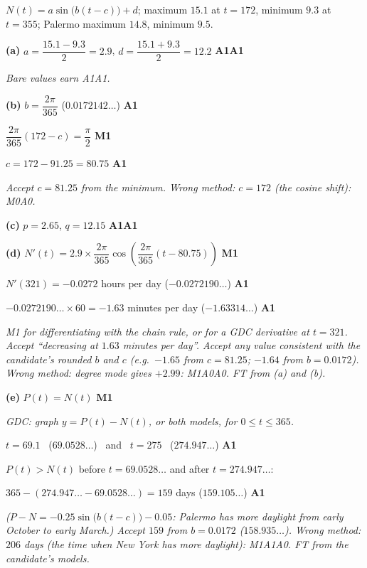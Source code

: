 \documentclass[12pt, twoside]{article}
\begin{document}
\begin{enumerate}[itemsep=0.3cm]
$N(t) = a\sin\bigl(b(t - c)\bigr) + d$; maximum $15.1$ at $t = 172$,
minimum $9.3$ at $t = 355$; Palermo maximum $14.8$, minimum $9.5$.

\textbf{(a)} $a = \dfrac{15.1 - 9.3}{2} = 2.9$, \quad
$d = \dfrac{15.1 + 9.3}{2} = 12.2$ \hfill \textbf{A1A1}

\emph{Bare values earn A1A1.}

\textbf{(b)} $b = \dfrac{2\pi}{365}$ \quad ($0.0172142\ldots$) \hfill \textbf{A1}

$\dfrac{2\pi}{365}(172 - c) = \dfrac{\pi}{2}$ \hfill \textbf{M1}

$c = 172 - 91.25 = 80.75$ \hfill \textbf{A1}

\emph{Accept $c = 81.25$ from the minimum. Wrong method: $c = 172$ (the
cosine shift): M0A0.}

\textbf{(c)} $p = 2.65$, \quad $q = 12.15$ \hfill \textbf{A1A1}

\textbf{(d)} $N'(t) = 2.9 \times \dfrac{2\pi}{365}\cos\left(\dfrac{2\pi}{365}(t - 80.75)\right)$
\hfill \textbf{M1}

$N'(321) = -0.0272$ hours per day \quad ($-0.0272190\ldots$) \hfill \textbf{A1}

$-0.0272190\ldots \times 60 = -1.63$ minutes per day \quad ($-1.63314\ldots$)
\hfill \textbf{A1}

\emph{M1 for differentiating with the chain rule, or for a GDC derivative at
$t = 321$. Accept ``decreasing at $1.63$ minutes per day''. Accept any value
consistent with the candidate's rounded $b$ and $c$ (e.g.\ $-1.65$ from
$c = 81.25$; $-1.64$ from $b = 0.0172$). Wrong method: degree mode gives
$+2.99$: M1A0A0. FT from (a) and (b).}

\textbf{(e)} $P(t) = N(t)$ \hfill \textbf{M1}

\textit{GDC: graph $y = P(t) - N(t)$, or both models, for $0 \le t \le 365$.}

$t = 69.1$ \ ($69.0528\ldots$) \ and \ $t = 275$ \ ($274.947\ldots$)
\hfill \textbf{A1}

$P(t) > N(t)$ before $t = 69.0528\ldots$ and after $t = 274.947\ldots$:

$365 - (274.947\ldots - 69.0528\ldots) = 159$ days \quad ($159.105\ldots$)
\hfill \textbf{A1}

\emph{($P - N = -0.25\sin\bigl(b(t - c)\bigr) - 0.05$: Palermo has more
daylight from early October to early March.) Accept $159$ from
$b = 0.0172$ ($158.935\ldots$). Wrong method: $206$ days (the time when New
York has more daylight): M1A1A0. FT from the candidate's models.}

\end{enumerate}
\end{document}
